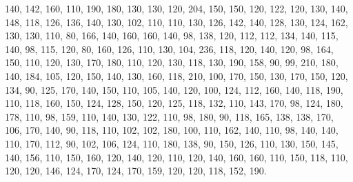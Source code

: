 \documentclass[twoside,leqno,11pt]{article}
\begin{document}
         140,
         142,
         160,
         110,
         190,
         180,
         130,
         130,
         120,
         204,
         150,
         150,
         120,
         122,
         120,
         130,
         140,
         148,
         118,
         126,
         136,
         140,
         130,
         102,
         110,
         110,
         130,
         126,
         142,
         140,
         128,
         130,
         124,
         162,
         130,
         130,
         110,
         80,
         166,
         140,
         160,
         160,
         140,
         98,
         138,
         120,
         112,
         112,
         134,
         140,
         115,
         140,
         98,
         115,
         120,
         80,
         160,
         126,
         110,
         130,
         104,
         236,
         118,
         120,
         140,
         120,
         98,
         164,
         150,
         110,
         120,
         130,
         170,
         180,
         110,
         120,
         130,
         118,
         130,
         190,
         158,
         90,
         99,
         210,
         180,
         140,
         184,
         105,
         120,
         150,
         140,
         130,
         160,
         118,
         210,
         100,
         170,
         150,
         130,
         170,
         150,
         120,
         134,
         90,
         125,
         170,
         140,
         150,
         110,
         105,
         140,
         120,
         100,
         124,
         112,
         160,
         140,
         118,
         190,
         110,
         118,
         160,
         150,
         124,
         128,
         150,
         120,
         125,
         118,
         132,
         110,
         143,
         170,
         98,
         124,
         180,
         178,
         110,
         98,
         159,
         110,
         140,
         130,
         122,
         110,
         98,
         180,
         90,
         118,
         165,
         138,
         138,
         170,
         106,
         170,
         140,
         90,
         118,
         110,
         102,
         102,
         180,
         100,
         110,
         162,
         140,
         110,
         98,
         140,
         140,
         110,
         170,
         112,
         90,
         102,
         106,
         124,
         110,
         180,
         138,
         90,
         150,
         126,
         110,
         130,
         150,
         145,
         140,
         156,
         110,
         150,
         160,
         120,
         140,
         120,
         110,
         120,
         140,
         160,
         160,
         110,
         150,
         118,
         110,
         120,
         120,
         146,
         124,
         170,
         124,
         170,
         159,
         120,
         120,
         118,
         152,
         190.
\end{document}
